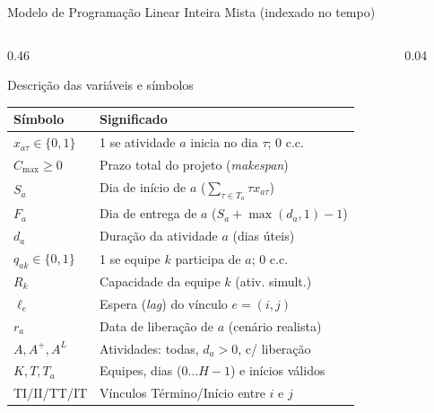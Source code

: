 \documentclass[aspectratio=169]{beamer}
\begin{document}
\begin{frame}{Modelo de Programação Linear Inteira Mista (indexado no tempo)}

\begin{columns}[T,onlytextwidth]

\begin{column}{0.46\textwidth}
\begin{block}{Descrição das variáveis e símbolos}
\fontsize{6.3pt}{7.6pt}\selectfont
\centering
\renewcommand{\arraystretch}{1.12}
\begin{tabular}{@{}ll@{}}
\toprule
\textbf{Símbolo} & \textbf{Significado} \\
\midrule
$x_{a\tau} \in \{0,1\}$ & 1 se atividade $a$ inicia no dia $\tau$; 0 c.c. \\
$C_{\max} \ge 0$ & Prazo total do projeto (\emph{makespan}) \\
$S_a$ & Dia de início de $a$ ($\sum_{\tau \in T_a} \tau x_{a\tau}$) \\
$F_a$ & Dia de entrega de $a$ ($S_a + \max(d_a,1) - 1$) \\
$d_a$ & Duração da atividade $a$ (dias úteis) \\
$q_{ak} \in \{0,1\}$ & 1 se equipe $k$ participa de $a$; 0 c.c. \\
$R_k$ & Capacidade da equipe $k$ (ativ. simult.) \\
$\ell_e$ & Espera (\emph{lag}) do vínculo $e=(i,j)$ \\
$r_a$ & Data de liberação de $a$ (cenário realista) \\
$A, A^+, A^L$ & Atividades: todas, $d_a > 0$, c/ liberação \\
$K, T, T_a$ & Equipes, dias ($0 \ldots H{-}1$) e inícios válidos \\
TI/II/TT/IT & Vínculos Término/Início entre $i$ e $j$ \\
\bottomrule
\end{tabular}
\end{block}
\end{column}

\begin{column}{0.04\textwidth}\end{column}


\end{columns}
\end{frame}
\end{document}
